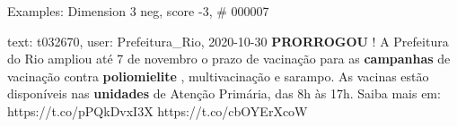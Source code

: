 \begin{frame}{Examples: Dimension 3 neg, score -3, \# 000007}
\footnotesize
\begin{alertblock}{text: t032670, user: Prefeitura\_Rio, 2020-10-30}
  \textbf{PRORROGOU} ! A Prefeitura 
do Rio ampliou até 7 de novembro o prazo de vacinação para as 
\textbf{campanhas} de vacinação contra \textbf{poliomielite} , multivacinação e 
sarampo. As vacinas estão disponíveis nas \textbf{unidades} de Atenção 
Primária, das 8h às 17h. Saiba mais em: https://t.co/pPQkDvxI3X 
https://t.co/cbOYErXcoW 
\end{alertblock}
\end{frame}
